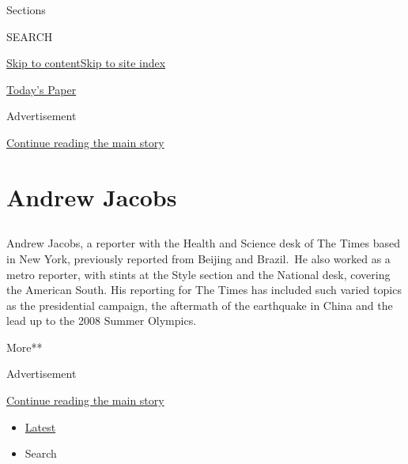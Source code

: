 Sections

SEARCH

\protect\hyperlink{site-content}{Skip to
content}\protect\hyperlink{site-index}{Skip to site index}

\href{https://myaccount.nytimes3xbfgragh.onion/auth/login?response_type=cookie\&client_id=vi}{}

\href{https://www.nytimes3xbfgragh.onion/section/todayspaper}{Today's
Paper}

Advertisement

\protect\hyperlink{after-top}{Continue reading the main story}

\hypertarget{andrew-jacobs}{%
\section{Andrew Jacobs}\label{andrew-jacobs}}

\subsection{}

Andrew Jacobs, a reporter with the Health and Science desk of The Times
based in New York, previously reported from Beijing and Brazil.~He also
worked as a metro reporter, with stints at the Style section and the
National desk, covering the American South. His reporting for The Times
has included such varied topics as the presidential campaign, the
aftermath of the earthquake in China and the lead up to the 2008 Summer
Olympics.

More**

Advertisement

\protect\hyperlink{after-mid1}{Continue reading the main story}

\begin{itemize}
\tightlist
\item
  \protect\hyperlink{stream-panel}{Latest}
\item
  Search
\end{itemize}


